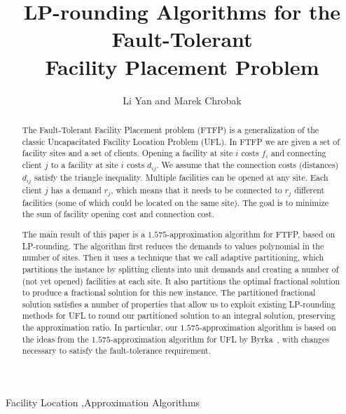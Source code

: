 \documentclass[preprint,12pt]{elsarticle}
\begin{document}
\begin{frontmatter}
\title{LP-rounding Algorithms for the Fault-Tolerant\\
 		Facility Placement Problem}

\author{Li Yan and Marek Chrobak}
\address{Department of Computer Science\\
 University of California at Riverside}

\begin{abstract} 
  The Fault-Tolerant Facility Placement problem (FTFP) is a
  generalization of the classic Uncapacitated Facility
  Location Problem (UFL). In FTFP we are given a set of
  facility sites and a set of clients. Opening a facility at
  site $i$ costs $f_i$ and connecting client $j$ to a
  facility at site $i$ costs $d_{ij}$. We assume that the
  connection costs (distances) $d_{ij}$ satisfy the triangle
  inequality. Multiple facilities can be opened at any
  site. Each client $j$ has a demand $r_j$, which means that
  it needs to be connected to $r_j$ different facilities
  (some of which could be located on the same site). The
  goal is to minimize the sum of facility opening cost and
  connection cost.

  The main result of this paper is a $1.575$-approximation algorithm
  for FTFP, based on LP-rounding. The algorithm first reduces the
  demands to values polynomial in the number of sites. Then it uses a
  technique that we call adaptive partitioning, which partitions the
  instance by splitting clients into unit demands and creating a
  number of (not yet opened) facilities at each site. It also
  partitions the optimal fractional solution to produce a fractional
  solution for this new instance.  The partitioned fractional solution
  satisfies a number of properties that allow us to exploit existing
  LP-rounding methods for UFL to round our partitioned solution to an
  integral solution, preserving the approximation ratio.  In
  particular, our $1.575$-approximation algorithm is based on the
  ideas from the $1.575$-approximation algorithm for UFL by
  Byrka~\etal, with changes necessary to satisfy the fault-tolerance
  requirement.
\end{abstract}

\begin{keyword}
Facility Location \sep Approximation Algorithms
\end{keyword}

\end{frontmatter}
\end{document}
